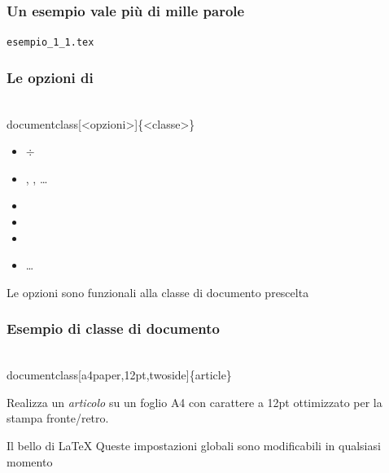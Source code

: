 \documentclass[svgnames,%
	ucs,%
	pdftex]{guitbeamer}
\begin{document}
\begin{frame}
  \frametitle{Un esempio vale pi\`u di mille parole}
	\begin{center}
		\alert{\texttt{esempio\_1\_1.tex}}
	\end{center}
\end{frame}
\begin{frame}
  \frametitle{Le opzioni di }
	\begin{LaTeXcode}
		\\documentclass[\alert{<opzioni>}]\{<classe>\}
	\end{LaTeXcode}
	\begin{itemize}
		\item \Lopt{8pt} $\div$ \Lopt{12pt}
		\item {}, , \dots
		\item {}%
		\item {}%
		\item {}%
		\item \dots
	\end{itemize}
  \bigskip
	Le opzioni sono funzionali alla classe di documento prescelta
\end{frame}
\begin{frame}
  \frametitle{Esempio di classe di documento}
	\begin{LaTeXcode}
		\\documentclass[\alert{a4paper,12pt,twoside}]\{\alert{article}\}
	\end{LaTeXcode}
	Realizza un \emph{articolo} su un foglio \alert{A4} con carattere
	a \alert{12pt} ottimizzato per la stampa \alert{fronte/retro}.
  \bigskip
	\begin{block}{Il bello di \LaTeX}
		Queste impostazioni globali sono modificabili in qualsiasi momento
	\end{block}
\end{frame}
\end{document}

